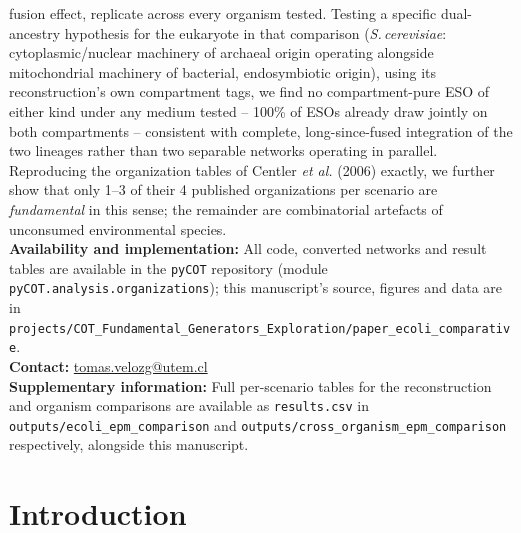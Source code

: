 \documentclass[nocrop]{bioinfo}
\begin{document}
{fusion effect, replicate across every organism tested. Testing a specific dual-ancestry hypothesis for the eukaryote in that comparison
(\textit{S.\,cerevisiae}: cytoplasmic/nuclear machinery of archaeal origin operating alongside
mitochondrial machinery of bacterial, endosymbiotic origin), using its reconstruction's own
compartment tags, we find no compartment-pure ESO of either kind under any medium tested --
100\% of ESOs already draw jointly on both compartments -- consistent with complete,
long-since-fused integration of the two lineages rather than two separable networks operating in
parallel. Reproducing the organization tables of
Centler \textit{et al.} (2006) exactly, we further show that only 1--3 of their 4 published
organizations per scenario are \emph{fundamental} in this sense; the remainder are combinatorial
artefacts of unconsumed environmental species.
\\
\textbf{Availability and implementation:} All code, converted networks and result tables are
available in the \texttt{pyCOT} repository (module \texttt{pyCOT.analysis.organizations}); this
manuscript's source, figures and data are in
\texttt{projects/COT\_Fundamental\_Generators\_Exploration/paper\_ecoli\_comparative}.
\\
\textbf{Contact:} \href{tomas.velozg@utem.cl}{tomas.velozg@utem.cl}
\\
\textbf{Supplementary information:} Full per-scenario tables for the reconstruction and
organism comparisons are available as \texttt{results.csv} in
\texttt{outputs/ecoli\_epm\_comparison} and \texttt{outputs/cross\_organism\_epm\_comparison}
respectively, alongside this manuscript.}

\maketitle

\section{Introduction}
\end{document}
